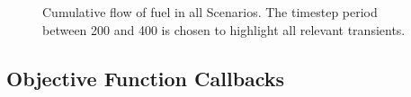 \begin{figure}
  \centering
  \begin{minipage}{0.9\textwidth}
    \centering
    \vfill
  \end{minipage}%
  \caption[]{
    \label{fig:flows}
    Cumulative flow of fuel in all Scenarios. The timestep period between 200
    and 400 is chosen to highlight all relevant transients. }
\end{figure}



\subsection{Objective Function Callbacks}\label{subsection:callback}

